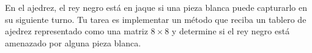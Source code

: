 En el ajedrez, el rey negro está en jaque si una pieza blanca puede capturarlo en su siguiente turno.  
Tu tarea es implementar un método que reciba un tablero de ajedrez representado como una matriz \(8 \times 8\) y determine si el rey negro está amenazado por alguna pieza blanca.
